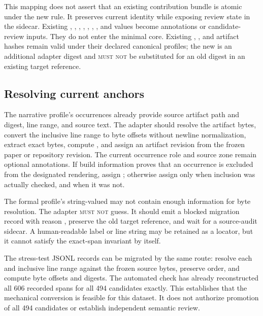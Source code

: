 This mapping does not assert that an existing contribution bundle is atomic under the new rule. It preserves current identity while exposing review state in the sidecar. Existing , , , , , , , and  values become annotations or candidate-review inputs. They do not enter the minimal core. Existing , , and artifact hashes remain valid under their declared canonical profiles; the new  is an additional adapter digest and \textsc{must not} be substituted for an old digest in an existing target reference.

\subsection{Resolving current anchors}

The narrative profile's occurrences already provide source artifact path and digest, line range, and source text. The adapter should resolve the artifact bytes, convert the inclusive line range to byte offsets without newline normalization, extract exact bytes, compute , and assign an artifact revision from the frozen paper or repository revision. The current occurrence role and source zone remain optional annotations. If build information proves that an occurrence is excluded from the designated rendering, assign ; otherwise assign  only when inclusion was actually checked, and  when it was not.

The formal profile's string-valued  may not contain enough information for byte resolution. The adapter \textsc{must not} guess. It should emit a blocked migration record with reason , preserve the old target reference, and wait for a source-audit sidecar. A human-readable label or line string may be retained as a locator, but it cannot satisfy the exact-span invariant by itself.

The stress-test JSONL records can be migrated by the same route: resolve each  and inclusive line range against the frozen source bytes, preserve order, and compute byte offsets and digests. The automated check has already reconstructed all 606 recorded spans for all 494 candidates exactly. This establishes that the mechanical conversion is feasible for this dataset. It does not authorize promotion of all 494 candidates or establish independent semantic review.

